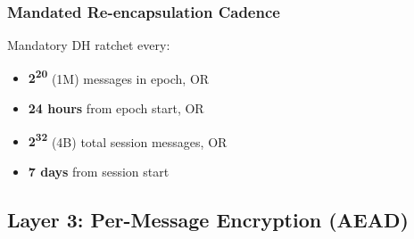 \documentclass[11pt,a4paper,oneside]{book}
\begin{document}
\subsubsection{Mandated Re-encapsulation Cadence}
Mandatory DH ratchet every:
\begin{itemize}
  \item \textbf{2\textsuperscript{20}} (1M) messages in epoch, OR
  \item \textbf{24 hours} from epoch start, OR
  \item \textbf{2\textsuperscript{32}} (4B) total session messages, OR
  \item \textbf{7 days} from session start
\end{itemize}
\vspace{-0.2cm}\subsection{Layer 3: Per-Message Encryption (AEAD)}
\end{document}
